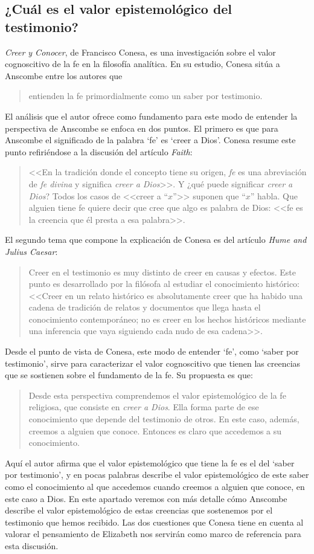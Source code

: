 \subsection{¿Cuál es el valor epistemológico del testimonio?}

\emph{Creer y Conocer}, de Francisco Conesa, es una investigación sobre el valor cognoscitivo de la fe en la filosofía analítica. En su estudio, Conesa sitúa a Anscombe entre los autores que \blockquote[{\cite[84]{conesa1994cc}}]{entienden la fe primordialmente como un saber por testimonio.} El análisis que el autor ofrece como fundamento para este modo de entender la perspectiva de Anscombe se enfoca en dos puntos. El primero es que para Anscombe el significado de la palabra `fe' es `creer a Dios'. Conesa resume este punto refiriéndose a la discusión del artículo \emph{Faith}: \blockquote[{\cite[87--88]{conesa1994cc}}]{<<En la tradición donde el concepto tiene su origen, \emph{fe} es una abreviación de \emph{fe divina} y significa \emph{creer a Dios}>>. Y ¿qué puede significar \emph{creer a Dios}? Todos los casos de <<creer a ``$x$''>> suponen que ``$x$'' habla. Que alguien tiene fe quiere decir que cree que algo es palabra de Dios: <<fe es la creencia que él presta a esa palabra>>.} El segundo tema que compone la explicación de Conesa es del artículo \emph{Hume and Julius Caesar}: \blockquote[{\cite[88]{conesa1994cc}}]{Creer en el testimonio es muy distinto de creer en causas y efectos. Este punto es desarrollado por la filósofa al estudiar el conocimiento histórico: <<Creer en un relato histórico es absolutamente creer que ha habido una cadena de tradición de relatos y documentos que llega hasta el conocimiento contemporáneo; no es creer en los hechos históricos mediante una inferencia que vaya siguiendo cada nudo de esa cadena>>.}

Desde el punto de vista de Conesa, este modo de entender `fe', como `saber por testimonio', sirve para caracterizar el valor cognoscitivo que tienen las creencias que se sostienen sobre el fundamento de la fe. Su propuesta es que: \blockquote[{\cite[88]{conesa1994cc}}]{Desde esta perspectiva comprendemos el valor epistemológico de la fe religiosa, que consiste en \emph{creer a Dios}. Ella forma parte de ese conocimiento que depende del testimonio de otros. En este caso, además, creemos a alguien que conoce. Entonces es claro que accedemos a su conocimiento.} Aquí el autor afirma que el valor epistemológico que tiene la fe es el del `saber por testimonio', y en pocas palabras describe el valor epistemológico de este saber como el conocimiento al que accedemos cuando creemos a alguien que conoce, en este caso a Dios. En este apartado veremos con más detalle cómo Anscombe describe el valor epistemológico de estas creencias que sostenemos por el testimonio que hemos recibido. Las dos cuestiones que Conesa tiene en cuenta al valorar el pensamiento de Elizabeth nos servirán como marco de referencia para esta discusión.

